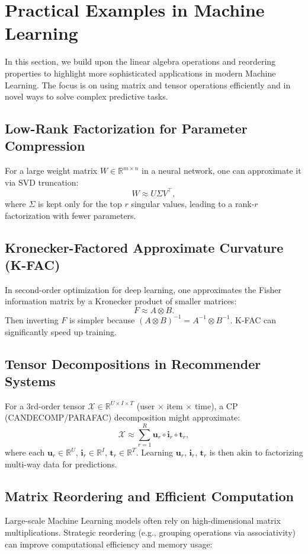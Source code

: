\section{Practical Examples in Machine Learning}

In this section, we build upon the linear algebra operations and reordering properties 
to highlight more sophisticated applications in modern Machine Learning. 
The focus is on using matrix and tensor operations efficiently and in novel ways to 
solve complex predictive tasks.

\subsection{Low-Rank Factorization for Parameter Compression}
For a large weight matrix $W \in \mathbb{R}^{m \times n}$ in a neural network, 
one can approximate it via SVD truncation:
\[
W \approx U \Sigma V^\top,
\]
where $\Sigma$ is kept only for the top $r$ singular values, 
leading to a rank-$r$ factorization with fewer parameters.

\subsection{Kronecker-Factored Approximate Curvature (K-FAC)}
In second-order optimization for deep learning, 
one approximates the Fisher information matrix by a Kronecker product of smaller matrices:
\[
F \approx A \otimes B.
\]
Then inverting $F$ is simpler because $(A \otimes B)^{-1} = A^{-1} \otimes B^{-1}$. 
K-FAC can significantly speed up training.

\subsection{Tensor Decompositions in Recommender Systems}
For a 3rd-order tensor $\mathcal{X} \in \mathbb{R}^{U \times I \times T}$ 
(user \(\times\) item \(\times\) time), 
a CP (CANDECOMP/PARAFAC) decomposition might approximate:
\[
\mathcal{X} \approx \sum_{r=1}^R \mathbf{u}_r \circ \mathbf{i}_r \circ \mathbf{t}_r,
\]
where each $\mathbf{u}_r \in \mathbb{R}^U$, $\mathbf{i}_r \in \mathbb{R}^I$, 
$\mathbf{t}_r \in \mathbb{R}^T$. Learning $\mathbf{u}_r$, $\mathbf{i}_r$, $\mathbf{t}_r$ 
is then akin to factorizing multi-way data for predictions.








\subsection{Matrix Reordering and Efficient Computation}
Large-scale Machine Learning models often rely on high-dimensional matrix multiplications. 
Strategic reordering (e.g., grouping operations via associativity) can improve computational 
efficiency and memory usage:

